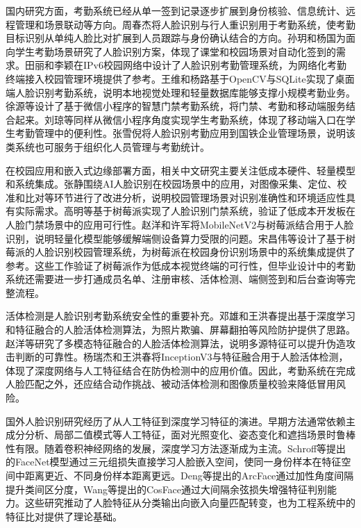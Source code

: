 国内研究方面，考勤系统已经从单一签到记录逐步扩展到身份核验、信息统计、远程管理和场景联动等方向。周春杰将人脸识别与行人重识别用于考勤系统，使考勤目标识别从单纯人脸比对扩展到人员跟踪与身份确认结合的方向\cite{zhou2019reid_attendance}。孙玥和杨国为面向学生考勤场景研究了人脸识别方案，体现了课堂和校园场景对自动化签到的需求\cite{sun2020student_face_attendance}。田丽和李颖在IPv6校园网络中设计了人脸识别考勤管理系统，为网络化考勤终端接入校园管理环境提供了参考\cite{tian2020ipv6_attendance}。王维和杨路基于OpenCV与SQLite实现了桌面端人脸识别考勤系统，说明本地视觉处理和轻量数据库能够支撑小规模考勤业务\cite{wang2021face_attendance}。徐源等设计了基于微信小程序的智慧门禁考勤系统，将门禁、考勤和移动端服务结合起来\cite{xu2022wechat_access}。刘琼等同样从微信小程序角度实现学生考勤系统，体现了移动端入口在学生考勤管理中的便利性\cite{liu2023wechat_attendance}。张雪倪将人脸识别考勤应用到国铁企业管理场景，说明该类系统也可服务于组织化人员管理与考勤统计\cite{zhang2025rail_attendance}。

在校园应用和嵌入式边缘部署方面，相关中文研究主要关注低成本硬件、轻量模型和系统集成。张静围绕AI人脸识别在校园场景中的应用，对图像采集、定位、校准和比对等环节进行了改进分析，说明校园管理场景对识别准确性和环境适应性具有实际需求\cite{zhang2021campus_ai}。高明等基于树莓派实现了人脸识别门禁系统，验证了低成本开发板在人脸门禁场景中的应用可行性\cite{gao2021raspberry_access}。赵洋和许军将MobileNetV2与树莓派结合用于人脸识别，说明轻量化模型能够缓解端侧设备算力受限的问题\cite{zhao2021mobilenet_rpi}。宋昌伟等设计了基于树莓派的人脸识别校园管理系统，为树莓派在校园身份识别场景中的系统集成提供了参考\cite{song2024rpi_campus}。这些工作验证了树莓派作为低成本视觉终端的可行性，但毕业设计中的考勤系统还需要进一步打通成员名单、注册审核、活体检测、端侧签到和后台查询等完整流程。

活体检测是人脸识别考勤系统安全性的重要补充。邓雄和王洪春提出基于深度学习和特征融合的人脸活体检测算法，为照片欺骗、屏幕翻拍等风险防护提供了思路\cite{deng2020liveness_fusion}。赵洋等研究了多模态特征融合的人脸活体检测算法，说明多源特征可以提升伪造攻击判断的可靠性\cite{zhao2022multimodal_liveness}。杨瑞杰和王洪春将InceptionV3与特征融合用于人脸活体检测，体现了深度网络与人工特征结合在防伪检测中的应用价值\cite{yang2022inception_liveness}。因此，考勤系统在完成人脸匹配之外，还应结合动作挑战、被动活体检测和图像质量校验来降低冒用风险。

国外人脸识别研究经历了从人工特征到深度学习特征的演进。早期方法通常依赖主成分分析、局部二值模式等人工特征，面对光照变化、姿态变化和遮挡场景时鲁棒性有限。随着卷积神经网络的发展，深度学习方法逐渐成为主流。Schroff等提出的FaceNet模型通过三元组损失直接学习人脸嵌入空间，使同一身份样本在特征空间中距离更近、不同身份样本距离更远\cite{schroff2015facenet}。Deng等提出的ArcFace通过加性角度间隔提升类间区分度\cite{deng2019arcface}，Wang等提出的CosFace通过大间隔余弦损失增强特征判别能力\cite{wang2018cosface}。这些研究推动了人脸特征从分类输出向嵌入向量匹配转变，也为工程系统中的特征比对提供了理论基础。


